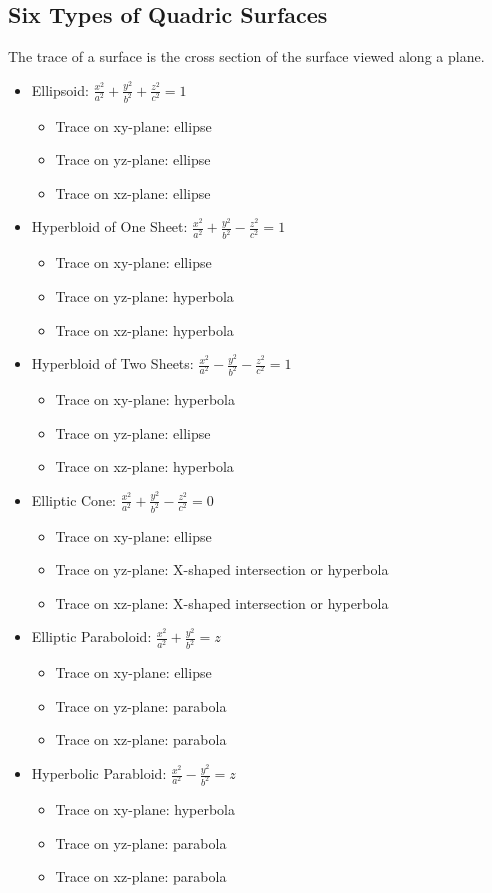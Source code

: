 \documentclass [12 pt, oneside] {book}
\begin{document}
\subsection{Six Types of Quadric Surfaces}
The trace of a surface is the cross section of the surface viewed along a plane.
\begin{itemize}
\item Ellipsoid: $\frac{x^2}{a^2}+\frac{y^2}{b^2}+\frac{z^2}{c^2}=1$
\begin{itemize}
\item Trace on xy-plane: ellipse
\item Trace on yz-plane: ellipse
\item Trace on xz-plane: ellipse
\end{itemize}
\item Hyperbloid of One Sheet: $\frac{x^2}{a^2}+\frac{y^2}{b^2}-\frac{z^2}{c^2}=1$
\begin{itemize}
\item Trace on xy-plane: ellipse 
\item Trace on yz-plane: hyperbola
\item Trace on xz-plane: hyperbola
\end{itemize}
\item Hyperbloid of Two Sheets: $\frac{x^2}{a^2}-\frac{y^2}{b^2}-\frac{z^2}{c^2}=1$
\begin{itemize}
\item Trace on xy-plane: hyperbola
\item Trace on yz-plane: ellipse
\item Trace on xz-plane: hyperbola
\end{itemize}
\item Elliptic Cone: $\frac{x^2}{a^2}+\frac{y^2}{b^2}-\frac{z^2}{c^2}=0$
\begin{itemize}
\item Trace on xy-plane: ellipse 
\item Trace on yz-plane: X-shaped intersection or hyperbola
\item Trace on xz-plane: X-shaped intersection or hyperbola
\end{itemize}
\item Elliptic Paraboloid: $\frac{x^2}{a^2}+\frac{y^2}{b^2}=z$
\begin{itemize}
\item Trace on xy-plane: ellipse
\item Trace on yz-plane: parabola
\item Trace on xz-plane: parabola
\end{itemize}
\item Hyperbolic Parabloid: $\frac{x^2}{a^2}-\frac{y^2}{b^2}=z$
\begin{itemize}
\item Trace on xy-plane: hyperbola
\item Trace on yz-plane: parabola
\item Trace on xz-plane: parabola
\end{itemize}
\end{itemize}
\end{document}
